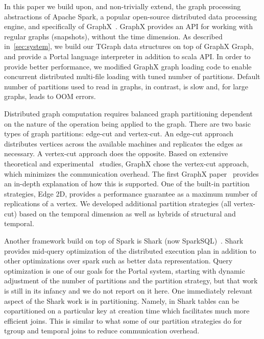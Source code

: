
In this paper we build upon, and non-trivially extend, the graph
processing abstractions of Apache Spark, a popular open-source
distributed data processing engine, and specifically of
GraphX~\cite{DBLP:conf/osdi/GonzalezXDCFS14}.  GraphX provides an API
for working with regular graphs (snapshots), without the time
dimension.  As described in~\ref{sec:system}, we build our TGraph data
structures on top of GraphX Graph, and provide a Portal language
interpreter in addition to scala API.  In order to provide better
performance, we modified GraphX graph loading code to enable
concurrent distributed multi-file loading with tuned number of
partitions.  Default number of partitions used to read in graphs, in
contrast, is slow and, for large graphs, leads to OOM errors.

Distributed graph computation requires balanced graph partitioning
dependent on the nature of the operation being applied to the graph.
There are two basic types of graph partitions: edge-cut and
vertex-cut.  An edge-cut approach distributes vertices across the
available machines and replicates the edges as necessary.  A
vertex-cut approach does the opposite.  Based on extensive theoretical
and experimental~\cite{Gonzalez2012} studies, GraphX chose the
vertex-cut approach, which minimizes the communication overhead.  The
first GraphX paper~\cite{Xin2013} provides an in-depth explanation of
how this is supported.  One of the built-in partition strategies, Edge
2D, provides a performance guarantee as a maximum number of
replications of a vertex.  We developed additional partition
strategies (all vertex-cut) based on the temporal dimension as well as
hybrids of structural and temporal.

Another framework build on top of Spark is Shark (now
SparkSQL)~\cite{Xin2013}.  Shark provides mid-query optimization of
the distributed execution plan in addition to other optimizations over
spark such as better data representation.  Query optimization is one
of our goals for the Portal system, starting with dynamic adjustment
of the number of partitions and the partition strategy, but that work
is still in its infancy and we do not report on it here.  One
immediately relevant aspect of the Shark work is in partitioning.
Namely, in Shark tables can be copartitioned on a particular key at
creation time which facilitates much more efficient joins.  This is
similar to what some of our partition strategies do for tgroup and
temporal joins to reduce communication overhead.

